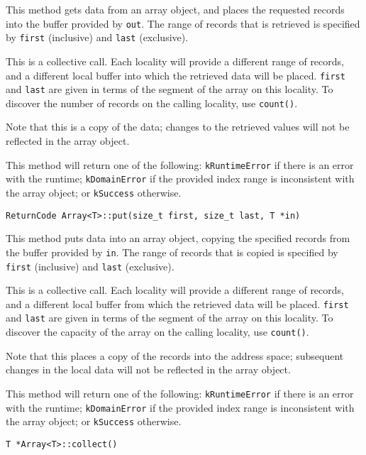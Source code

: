 \noindent This method gets data from an array object, and places the requested
records into the buffer provided by \texttt{out}. The range of records that is
retrieved is specified by \texttt{first} (inclusive) and \texttt{last}
(exclusive).

This is a collective call. Each locality will provide a different range of
records, and a different local buffer into which the retrieved data will be
placed. \texttt{first} and \texttt{last} are given in terms of the segment of
the array on this locality. To discover the number of records on the calling
locality, use \texttt{count()}.

Note that this is a copy of the data; changes to the retrieved values
will not be reflected in the array object.

This method will return one of the following: \texttt{kRuntimeError} if there
is an error with the runtime; \texttt{kDomainError} if the provided index range
is inconsistent with the array object; or \texttt{kSuccess} otherwise.

\begin{lstlisting}
ReturnCode Array<T>::put(size_t first, size_t last, T *in)
\end{lstlisting}

\noindent This method puts data into an array object, copying the specified
records from the buffer provided by \texttt{in}. The range of records that is
copied is specified by \texttt{first} (inclusive) and \texttt{last} (exclusive).

This is a collective call. Each locality will provide a different range of
records, and a different local buffer from which the retrieved data will be
placed. \texttt{first} and \texttt{last} are given in terms of the segment of
the array on this locality. To discover the capacity of the array on the
calling locality, use \texttt{count()}.

Note that this places a copy of the records into the address space;
subsequent changes in the local data will not be reflected in the array object.

This method will return one of the following: \texttt{kRuntimeError} if there
is an error with the runtime; \texttt{kDomainError} if the provided index
range is inconsistent with the array object; or \texttt{kSuccess} otherwise.

\begin{lstlisting}
T *Array<T>::collect()
\end{lstlisting}

